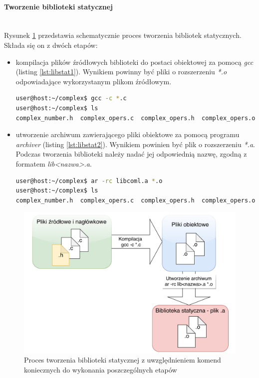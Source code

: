 \paragraph*{Tworzenie biblioteki statycznej}\mbox{}\\
Rysunek \ref{fig:staticlibflow} przedstawia schematycznie proces tworzenia bibliotek statycznych. Składa się on z dwóch etapów:
\begin{itemize}
\item kompilacja plików źródłowych biblioteki do postaci obiektowej za pomocą \textit{gcc} (listing \ref{lst:libstat1}). Wynikiem powinny być pliki o rozszerzeniu \textit{*.o} odpowiadające wykorzystanym plikom źródłowym.

\begin{lstlisting}[language=bash, caption={Kompilacja plików źródłowych biblioteki do postaci obiektowej - polecenie oraz jego wynik},label={lst:libstat1}]
user@host:~/complex$ gcc -c *.c
user@host:~/complex$ ls
complex_number.h  complex_opers.c  complex_opers.h  complex_opers.o
\end{lstlisting}


\item utworzenie archiwum zawierającego pliki obiektowe za pomocą programu \textit{archiver} (listing \ref{lst:libstat2}). Wynikiem powinien być plik o rozszerzeniu \textit{*.a}. Podczas tworzenia biblioteki należy nadać jej odpowiednią nazwę, zgodną z formatem \textit{lib<nazwa>.a}.

\begin{lstlisting}[language=bash, caption={Utworzenie biblioteki statycznej z plików obiektowych - polecenie oraz jego wynik},label={lst:libstat2}]
user@host:~/complex$ ar -rc libcoml.a *.o
user@host:~/complex$ ls
complex_number.h  complex_opers.c  complex_opers.h  complex_opers.o  libcoml.a
\end{lstlisting}

\end{itemize}

\begin{figure}%
\centering
\caption{Proces tworzenia biblioteki statycznej z uwzględnieniem komend koniecznych do wykonania poszczególnych etapów}
\label{fig:staticlibflow}
\includegraphics[width=\textwidth]{images/StaticLibFlow}
\end{figure}

